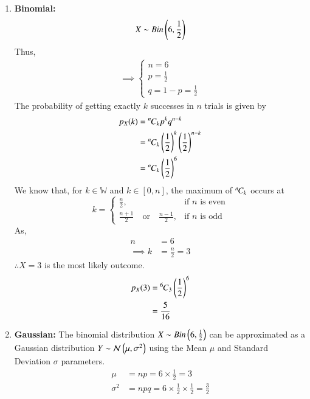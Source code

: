 \documentclass[journal,12pt,twocolumn]{IEEEtran}
\theoremstyle{remark}
\begin{document}
\begin{enumerate}
\item \textbf{Binomial:}
\begin{align}
    X \sim Bin\left(6,\frac{1}{2}\right) 
\end{align}
Thus,
\begin{align}
    \implies \begin{cases}
        n = 6\\
        p = \frac{1}{2}\\
        q = 1 - p = \frac{1}{2}
        \end{cases}\label{eq:9.3.19.1}
\end{align}
The probability of getting exactly $k$ successes in $n$ trials is given by 
\begin{align}
    p_X(k) &= {{}^{n}\mkern-1muC_{k}} p^kq^{n-k}\\
    &= {{}^{n}\mkern-1muC_{k}} \left(\frac{1}{2}\right)^k \left(\frac{1}{2}\right)^{n-k}\\
    &= {{}^{n}\mkern-1muC_{k}} \left(\frac{1}{2}\right)^6
\end{align}
We know that, for $k \in \mathbb{W}$ and $k \in [0,n]$, the maximum of ${{}^{n}\mkern-1muC_{k}}$ occurs at
\begin{equation}
    k =
    \begin{cases}
        \frac{n}{2}, & \text{if } n \text{ is even} \\
        \frac{n+1}{2} \quad \text{or} \quad \frac{n-1}{2}, & \text{if } n \text{ is odd} 
    \end{cases}
\end{equation}
As, 
\begin{align}
   	n&=6\\
   	\implies k&=\frac{n}{2}
   	=3
\end{align}
$\therefore X = 3$ is the most likely outcome.
\begin{align}
        p_X(3) &= {{}^{6}\mkern-1muC_{ 3}} \left(\frac{1}{2}\right)^6 \\
        &= \frac{5}{16}
\end{align}
\item \textbf{Gaussian:}
The binomial distribution $X \sim Bin\left(6,\frac{1}{2}\right)$ can be approximated as a Gaussian distribution $Y \sim \mathcal{N}\left(\mu, \sigma^2\right)$ using the Mean $\mu$ and Standard Deviation $\sigma$ parameters.
\begin{align}
    \mu &= np = 6 \times \frac{1}{2} = 3\\
    \sigma^2 &= npq = 6 \times \frac{1}{2} \times \frac{1}{2} = \frac{3}{2}
\end{align}

\end{enumerate}
\end{document}
